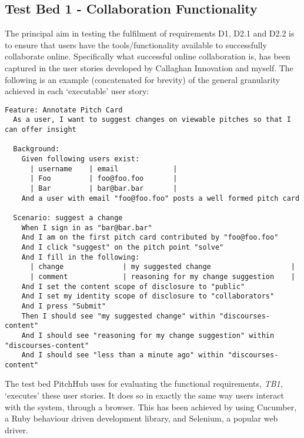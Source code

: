 \subsection{Test Bed 1 - Collaboration Functionality}\label{SS:collaborativeFunctionality}
The principal aim in testing the fulfilment of requirements D1, D2.1 and D2.2 is to ensure that users have the tools/functionality available to successfully collaborate online. Specifically what successful online collaboration is, has been captured in the user stories developed by Callaghan Innovation and myself. The following is an example (concatenated for brevity) of the general granularity achieved in each `executable' user story:

\begin{lstlisting}[language=ustory,firstnumber=1]
Feature: Annotate Pitch Card
  As a user, I want to suggest changes on viewable pitches so that I can offer insight

  Background:
    Given following users exist:
      | username    | email             |
      | Foo         | foo@foo.foo       |
      | Bar         | bar@bar.bar       |
    And a user with email "foo@foo.foo" posts a well formed pitch card

  Scenario: suggest a change
    When I sign in as "bar@bar.bar"
    And I am on the first pitch card contributed by "foo@foo.foo"
    And I click "suggest" on the pitch point "solve"
    And I fill in the following:
      | change              | my suggested change                   |
      | comment             | reasoning for my change suggestion    |
    And I set the content scope of disclosure to "public"
    And I set my identity scope of disclosure to "collaborators"
    And I press "Submit"
    Then I should see "my suggested change" within "discourses-content"
    And I should see "reasoning for my change suggestion" within "discourses-content"
    And I should see "less than a minute ago" within "discourses-content"

\end{lstlisting}

The test bed PitchHub uses for evaluating the functional requirements, \textit{TB1}, `executes' these user stories. It does so in exactly the same way users interact with the system, through a browser. This has been achieved by using Cucumber, a Ruby behaviour driven development library, and Selenium, a popular web driver.

